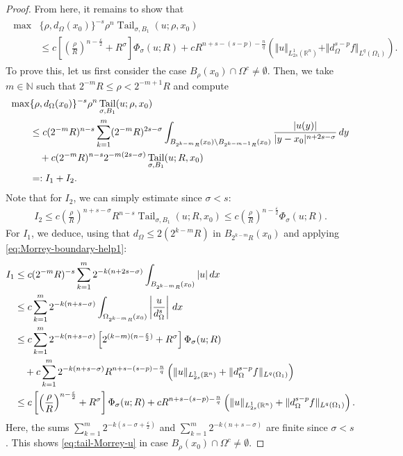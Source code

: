 \documentclass[11pt,reqno]{amsart}
\theoremstyle{plain}
\theoremstyle{definition}
\numberwithin{equation}{section}
\newcommand{\N}{\mathbb{N}}
\newcommand{\R}{\mathbb{R}}
\newcommand{\eps}{\varepsilon}
\newcommand{\1}{\mathbbm{1}}
\DeclareMathOperator{\tail}{Tail}
\renewcommand{\d}{\textnormal{\,d}}
\begin{document}
\begin{proof}
From here, it remains to show that
\begin{align}
\label{eq:tail-Morrey-u}
\begin{split}
\max&\{\rho,d_{\Omega}(x_0)\}^{-s} \rho^{n} \tail_{\sigma,B_1}(u;\rho, x_0)  \\
&\le c \left[ \left( \frac{\rho}{R} \right)^{n-\frac{\eps}{2}} + R^{\sigma} \right] \Phi_{\sigma}(u; R) + c R^{n+s - (s-p) -\frac{n}{q}} \left( \Vert u \Vert_{L^1_{2s}(\R^n)} + \Vert d_{\Omega}^{s-p} f \Vert_{L^q(\Omega_1)} \right).
\end{split}
\end{align}
To prove this, let us first consider the case $B_{\rho}(x_0) \cap \Omega^c \not= \emptyset$. Then, we take $m \in \N$ such that $2^{-m} R \leq \rho < 2^{-m+1}R$ and compute
\begin{align*}
\max&\{\rho,d_{\Omega}(x_0)\}^{-s} \rho^{n} \tail_{\sigma,B_1}(u ; \rho,x_0) \\
&\le c (2^{-m}R)^{n-s} \sum_{k = 1}^{m} (2^{-m}R)^{2s-\sigma} \int_{B_{2^{k-m}R}(x_0) \setminus B_{2^{k-m-1}R}(x_0)} \frac{|u(y)|}{|y - x_0|^{n+2s-\sigma}} \d y \\
&\quad + c (2^{-m}R)^{n-s} 2^{-m(2s-\sigma)} \tail_{\sigma,B_1}(u;R,x_0) \\
&=: I_1 + I_2.
\end{align*}
Note that for $I_2$, we can simply estimate since $\sigma < s$:
\begin{align*}
I_2 \le c \left( \frac{\rho}{R} \right)^{n+s-\sigma} R^{n-s} \tail_{\sigma,B_1}(u;R,x_0) \le c \left( \frac{\rho}{R} \right)^{n-\frac{\eps}{2}} \Phi_{\sigma}(u; R).
\end{align*}
For $I_1$, we deduce, using that $d_{\Omega} \le 2 (2^{k-m}R)$ in $B_{2^{k-m}R}(x_0)$ and applying \eqref{eq:Morrey-boundary-help1}:
\begin{align*}
I_1
&\le c (2^{-m}R)^{-s} \sum_{k = 1}^m 2^{-k(n+2s-\sigma)} \int_{B_{2^{k-m}R}(x_0)} |u| \d x \\
&\leq c \sum_{k = 1}^m 2^{-k(n+s-\sigma)} \int_{\Omega_{2^{k-m}R}(x_0)} \left| \frac{u}{d_{\Omega}^s} \right| \d x \\
&\le c \sum_{k = 1}^m 2^{-k(n+s-\sigma)} \left[ 2^{(k-m)(n-\frac{\varepsilon}{2})} + R^{\sigma} \right] \Phi_\sigma(u; R) \\
&\quad + c \sum_{k = 1}^m 2^{-k(n+s-\sigma)} R^{n+s-(s-p)-\frac{n}{q}} \left( \Vert u \Vert_{L^1_{2s}(\R^n)} + \Vert d_{\Omega}^{s-p} f \Vert_{L^q(\Omega_1)} \right) \\
&\le c \left[ \left( \frac{\rho}{R} \right)^{n-\frac{\varepsilon}{2}} + R^{\sigma} \right] \Phi_{\sigma}(u; R) + c R^{n+s - (s-p) -\frac{n}{q}} \left( \Vert u \Vert_{L^1_{2s}(\R^n)} + \Vert d_{\Omega}^{s-p} f \Vert_{L^q(\Omega_1)} \right).
\end{align*}
Here, the sums $\sum_{k=1}^m 2^{-k(s-\sigma+\frac{\varepsilon}{2})}$ and $\sum_{k = 1}^m 2^{-k(n+s-\sigma)}$ are finite since $\sigma<s$. This shows \eqref{eq:tail-Morrey-u} in case $B_{\rho}(x_0) \cap \Omega^c \not= \emptyset$.


\end{proof}
\end{document}
